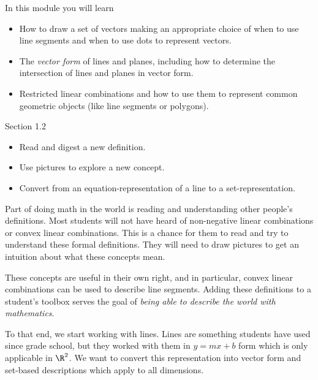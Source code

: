 \begin{module}

	In this module you will learn
	\begin{itemize}
		\item How to draw a set of vectors making an appropriate choice of when to use
			line segments and when to use dots to represent vectors.
		\item The \emph{vector form} of lines and planes, including how to determine
			the intersection of lines and planes in vector form.
		\item Restricted linear combinations and how to use them to represent common geometric
			objects (like line segments or polygons).
	\end{itemize}

	
	
	
\end{module}
\begin{lesson}

	 Section 1.2

	\begin{itemize}
		\item Read and digest a new definition.

		\item Use pictures to explore a new concept.

		\item Convert from an equation-representation of a line to a set-representation.
	\end{itemize}

	 Part of doing math in the world is reading and understanding
	other people's definitions. Most students will not have heard of non-negative
	linear combinations or convex linear combinations. This is a chance for them
	to read and try to understand these formal definitions. They will need to
	draw pictures to get an intuition about what these concepts mean.

	These concepts are useful in their own right, and in particular, convex linear
	combinations can be used to describe line segments. Adding these definitions
	to a student's toolbox serves the goal of \emph{being able to describe
	the world with mathematics}.

	To that end, we start working with lines. Lines are something students have
	used since grade school, but they worked with them in $y=mx+b$ form which
	is only applicable in $\R^{2}$. We want to convert this representation
	into vector form and set-based descriptions which apply to all
	dimensions.

\end{lesson}

